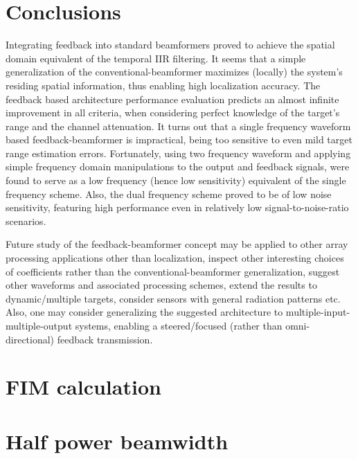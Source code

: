 \documentclass[journal]{IEEEtran}
\begin{document}
\section{Conclusions}
\label{sec_conclusions}
Integrating feedback into standard beamformers proved to achieve the spatial domain equivalent of the temporal IIR filtering.
It seems that a simple generalization of the conventional-beamformer maximizes (locally) the system's residing spatial information, thus enabling high localization accuracy.
The feedback based architecture performance evaluation predicts an almost infinite improvement in all criteria, when considering perfect knowledge of the target's range and the channel attenuation.
It turns out that a single frequency waveform based feedback-beamformer is impractical, being too sensitive to even mild target range estimation errors.
Fortunately, using two frequency waveform and applying simple frequency domain manipulations to the output and feedback signals, were found to serve as a low frequency (hence low sensitivity) equivalent of the single frequency scheme.
Also, the dual frequency scheme proved to be of low noise sensitivity, featuring high performance even in relatively low signal-to-noise-ratio scenarios.
\par Future study of the feedback-beamformer concept may be applied to other array processing applications other than localization, inspect other interesting choices of coefficients rather than the conventional-beamformer generalization, suggest other waveforms and associated processing schemes, extend the results to dynamic/multiple targets, consider sensors with general radiation patterns etc.
Also, one may consider generalizing the suggested architecture to multiple-input-multiple-output systems, enabling a steered/focused (rather than omni-directional) feedback transmission.
\appendices
\section{FIM calculation}
\label{apdx_clacFim}

\section{Half power beamwidth}
\label{apdx_HPBW}

\end{document}
